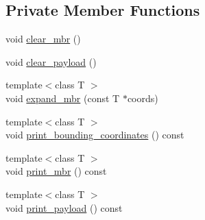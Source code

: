 \subsection*{Private Member Functions}
\begin{DoxyCompactItemize}
\item 
void \hyperlink{classTile_a9fc63b0a4d5291fa68110115eddcff76}{clear\+\_\+mbr} ()
\item 
void \hyperlink{classTile_ad8be9a18ae2e5b9e7f5784a7fc79e9a6}{clear\+\_\+payload} ()
\item 
{\footnotesize template$<$class T $>$ }\\void \hyperlink{classTile_a8a5fbda1085abcbf7a66df2d7ed72eab}{expand\+\_\+mbr} (const T $\ast$coords)
\item 
{\footnotesize template$<$class T $>$ }\\void \hyperlink{classTile_a6e8730e84bb54aa5815d80864112f289}{print\+\_\+bounding\+\_\+coordinates} () const 
\item 
{\footnotesize template$<$class T $>$ }\\void \hyperlink{classTile_a90fb3b8e9d3934ebf952477780b9c29e}{print\+\_\+mbr} () const 
\item 
{\footnotesize template$<$class T $>$ }\\void \hyperlink{classTile_a5bed5c5c9921ad9d1aae9e1972c9dd2c}{print\+\_\+payload} () const 
\end{DoxyCompactItemize}
